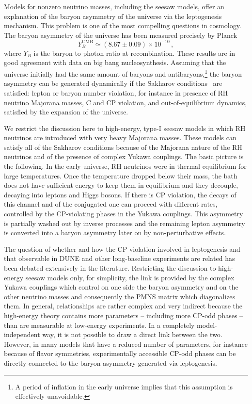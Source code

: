 Models for nonzero neutrino masses, including the seesaw models, offer an explanation of the baryon asymmetry of the universe via the leptogenesis mechanism. 
This problem is one of the most compelling questions in cosmology. The baryon asymmetry of the universe has been measured precisely by Planck~\cite{Aghanim:2018eyx}
\begin{equation}
Y_B^{\mathrm{CMB}}\simeq (8.67\pm 0.09) \times 10^{-10}\,,
\end{equation}
where $Y_B$ is the baryon to photon ratio at recombination. These results are in good agreement with data on big bang nucleosynthesis. Assuming that the universe initially had the same amount of baryons and antibaryons,\footnote{A period of inflation in the early universe implies that this assumption is effectively unavoidable.} the baryon asymmetry can be generated dynamically if the Sakharov conditions~\cite{Sakharov:1967dj} are satisfied: lepton or baryon number violation, for instance in presence of RH neutrino Majorana masses, C and CP violation, and out-of-equilibrium dynamics, satisfied by the expansion of the universe. 

We restrict the discussion here to high-energy, type-I seesaw models in which RH neutrinos are introduced with very heavy Majorana masses. 
These models can satisfy all of the Sakharov conditions because of the Majorana nature of the RH neutrinos and of the presence of complex Yukawa couplings. The basic picture is the following. In the early universe, RH neutrinos were in thermal equilibrium for large temperatures. Once the temperature dropped below their mass, the bath does not have sufficient energy to keep them in equilibrium and they decouple, decaying into leptons and Higgs bosons. If there is CP violation, the decays of this channel and of the conjugated one can proceed with different rates, controlled by the CP-violating phases in the Yukawa couplings. 
This asymmetry is partially washed out by inverse processes and the remaining lepton asymmetry is converted into a baryon asymmetry later on by non-perturbative  effects. 

The question of whether and how the CP-violation involved in leptogenesis and that observable
 in DUNE and other long-baseline experiments are related has been debated extensively in the
 literature. Restricting the discussion to high-energy seesaw models only, for simplicity, the link is
 provided by the complex Yukawa couplings which control on one side the baryon asymmetry and
 on the other neutrino masses and consequently the PMNS matrix which diagonalizes them. In
 general, relationships are rather complex and very indirect because the high-energy theory contains
  more parameters -- including more CP-odd phases -- than are measurable at low-energy experiments.
  In a completely model-independent way, it is not possible to draw a direct link between the two.
However, in many models that have a reduced number of parameters, for instance because of flavor symmetries,
 experimentally accessible CP-odd phases can be directly connected to the baryon asymmetry generated via leptogenesis.



